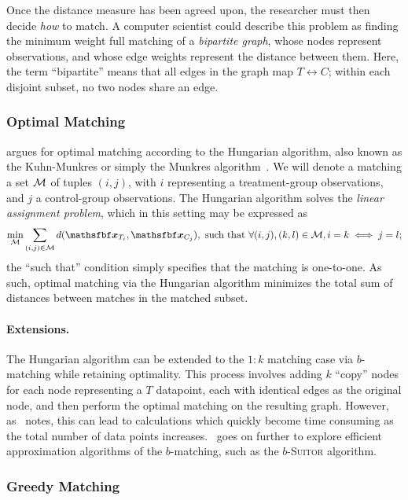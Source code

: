 \documentclass[11pt]{extarticle}
\begin{document}
Once the distance measure has been agreed upon, the researcher must then decide \emph{how} to match. A computer scientist could describe this problem as finding the minimum weight full matching of a \emph{bipartite graph}, whose nodes represent observations, and whose edge weights represent the distance between them. Here, the term ``bipartite'' means that all edges in the graph map $T \leftrightarrow C$; within each disjoint subset, no two nodes share an edge.


\subsubsection{Optimal Matching}

\textcite{rosenbaum_optimal_1989} argues for optimal matching according to the Hungarian algorithm, also known as the Kuhn-Munkres or simply the Munkres algorithm~\parencite{munkres_algorithms_1957}. We will denote a matching a set $\mathcal{M}$ of tuples $(i, j)$, with $i$ representing a treatment-group observations, and $j$ a control-group observations. The Hungarian algorithm solves the \emph{linear assignment problem}, which in this setting may be expressed as
\begin{equation}
  \min_{\set{M}} \sum_{(i, j) \in \set{M}} d(\vec{x}_{T_{i}}, \vec{x}_{C_{j}}), \text{ such that } \forall (i, j), (k, l) \in \set{M}, i = k \iff j = l;
\end{equation}
the ``such that'' condition simply specifies that the matching is one-to-one. As such, optimal matching via the Hungarian algorithm minimizes the total sum of distances between matches in the matched subset.

\paragraph{Extensions.} The Hungarian algorithm can be extended to the $1:k$ matching case via $b$-matching while retaining optimality.
This process involves adding $k$ ``copy'' nodes for each node representing a $T$ datapoint, each with identical edges as the original node, and then perform the optimal matching on the resulting graph.
However, as~\textcite{khan_efficient_2016} notes, this can lead to calculations which quickly become time consuming as the total number of data points increases.~\textcite{khan_efficient_2016} goes on further to explore efficient approximation algorithms of the $b$-matching, such as the $b$-\textsc{Suitor} algorithm.

\subsubsection{Greedy Matching}
\end{document}
